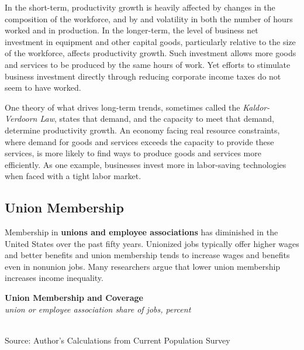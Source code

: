 \documentclass{report}
\makeatletter
\newcommand{\tbllink}[1]{\href{https://raw.githubusercontent.com/bdecon/US-chartbook/master/chartbook/data/#1}{\faTable}}
\newcommand*\short[1]{\expandafter\@gobbletwo\number\numexpr#1\relax}
\newcommand{\ctsbar}[5]{
		\addplot[ybar stacked, bar width=#5, draw opacity=0, fill=#1] 
			table [x=#2, y=#3, col sep=comma]{#4};}
\newcommand{\dateaxisticks}{
		date coordinates in=x, axis line style={draw=none},
		xmax={2022-03-15},
		max space between ticks=40,	    
		xtick={{1990-01-01}, {1992-01-01}, {1994-01-01}, 
			{1996-01-01}, {1998-01-01}, {2000-01-01}, 
			{2002-01-01}, {2004-01-01}, {2006-01-01},
			{2008-01-01}, {2010-01-01}, {2012-01-01}, {2014-01-01},
		    {2016-01-01}, {2018-01-01}, {2020-01-01}, {2022-01-01}, 
		    {2024-01-01}, {2026-01-01}},
		minor xtick={{1989-01-01}, {1991-01-01}, {1993-01-01},
			{1995-01-01}, {1997-01-01}, {1999-01-01}, 
			{2001-01-01}, {2003-01-01}, {2005-01-01}, {2007-01-01},
		    {2009-01-01}, {2011-01-01}, {2013-01-01}, {2015-01-01},
		    {2017-01-01}, {2019-01-01}, {2021-01-01}, {2023-01-01}, 
		    {2025-01-01}, {2027-01-01}},
		enlarge y limits={0.06}, enlarge x limits={0.01},
		}
\newcommand{\bbar}[2]{extra #1 ticks = {{#2}}, extra #1 tick labels = ,
		extra #1 tick style = {grid=major, grid style={thick, black!25}},}
\newcommand{\rbars}{
		\fill[color=black!10] (axis cs:{1990-07-01},\pgfkeysvalueof{/pgfplots/ymin}) rectangle 
			(axis cs:{1991-03-01}, \pgfkeysvalueof{/pgfplots/ymax});
		\fill[color=black!10] (axis cs:{2007-12-01},\pgfkeysvalueof{/pgfplots/ymin}) rectangle 
			(axis cs:{2009-07-01}, \pgfkeysvalueof{/pgfplots/ymax});
		\fill[color=black!10] (axis cs:{2001-03-01},\pgfkeysvalueof{/pgfplots/ymin}) rectangle 
			(axis cs:{2001-11-01}, \pgfkeysvalueof{/pgfplots/ymax});
		\fill[color=black!10] (axis cs:{2020-02-01},\pgfkeysvalueof{/pgfplots/ymin}) rectangle 
			(axis cs:{2020-05-01}, \pgfkeysvalueof{/pgfplots/ymax});}
\makeatother
\begin{document}
{{\begin{minipage}{0.76\textwidth}
\small In the short-term, productivity growth is heavily affected by changes in the composition of the workforce, and by and volatility in both the number of hours worked and in production. In the longer-term, the level of business net investment in equipment and other capital goods, particularly relative to the size of the workforce, affects productivity growth. Such investment allows more goods and services to be produced by the same hours of work. Yet efforts to stimulate business investment directly through reducing corporate income taxes do not seem to have worked. 

One theory of what drives long-term trends, sometimes called the \textit{Kaldor-Verdoorn Law}, states that demand, and the capacity to meet that demand, determine productivity growth. An economy facing real resource constraints, where demand for goods and services exceeds the capacity to provide these services, is more likely to find ways to produce goods and services more efficiently. As one example, businesses invest more in labor-saving technologies when faced with a tight labor market. 
\end{minipage}
\newpage
\begin{minipage}{0.76\textwidth}
\subsection*{Union Membership}
\hypertarget{labun}{}
\small Membership in \textbf{unions and employee associations} has diminished in the United States over the past fifty years. Unionized jobs typically offer higher wages and better benefits and union membership tends to increase wages and benefits even in nonunion jobs. Many researchers argue that lower union membership increases income inequality. 


\vspace{3mm}

\normalsize \textbf{Union Membership and Coverage}\\
\footnotesize{\textit{union or employee association share of jobs, percent}}\\
\hspace*{-2mm} \\
\footnotesize{Source: Author's Calculations from Current Population Survey} \hfill \tbllink{union.csv}
\end{minipage}
\vspace{2mm}

}}
\end{document}

